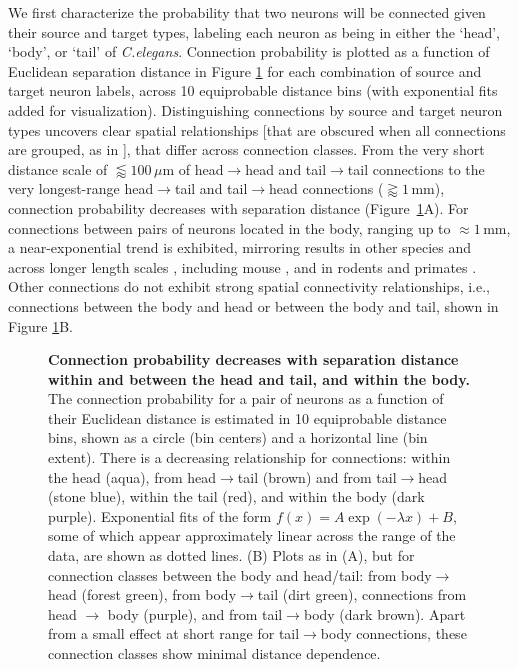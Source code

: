 We first characterize the probability that two neurons will be connected given their source and target types, labeling each neuron as being in either the `head', `body', or `tail' of \emph{C.elegans}.
Connection probability is plotted as a function of Euclidean separation distance in Figure \ref{fig:Ch2Fig3} for each combination of source and target neuron labels, across 10 equiprobable distance bins (with exponential fits added for visualization).
Distinguishing connections by source and target neuron types uncovers clear spatial relationships [that are obscured when all connections are grouped, as in \citep{Azulay2016}], that differ across connection classes.
From the very short distance scale of $\lessapprox 100\,\mu$m of head$\rightarrow$head and tail$\rightarrow$tail connections to the very longest-range head$\rightarrow$tail and tail$\rightarrow$head connections ($\gtrapprox 1\,$mm), connection probability decreases with separation distance \mbox{(Figure \ref{fig:Ch2Fig3}A)}.
For connections between pairs of neurons located in the body, ranging up to $\approx 1$\,mm, a near-exponential trend is exhibited, mirroring results in other species and across longer length scales \citep{Wang2016}, including mouse \citep{Goulas2017, Fulcher2016}, and in rodents and primates \citep{Horvat2016}.
Other connections do not exhibit strong spatial connectivity relationships, i.e., connections between the body and head or between the body and tail, shown in Figure \ref{fig:Ch2Fig3}B.

\begin{figure}[h]
  \caption{
\textbf{Connection probability decreases with separation distance within and between the head and tail, and within the body.}
The connection probability for a pair of neurons as a function of their Euclidean distance is estimated in 10 equiprobable distance bins, shown as a circle (bin centers) and a horizontal line (bin extent).
There is a decreasing relationship for connections: within the head (aqua), from head$\rightarrow$tail (brown) and from tail$\rightarrow$head (stone blue), within the tail (red), and within the body (dark purple).
Exponential fits of the form $f(x) = A\exp(-\lambda x) + B$, some of which appear approximately linear across the range of the data, are shown as dotted lines.
(B)
Plots as in (A), but for connection classes between the body and head/tail: from body$\rightarrow$head (forest green), from body$\rightarrow$tail (dirt green), connections from head $\rightarrow$ body (purple), and from tail$\rightarrow$body (dark brown).
Apart from a small effect at short range for tail$\rightarrow$body connections, these connection classes show minimal distance dependence.}
\label{fig:Ch2Fig3}
\end{figure}

